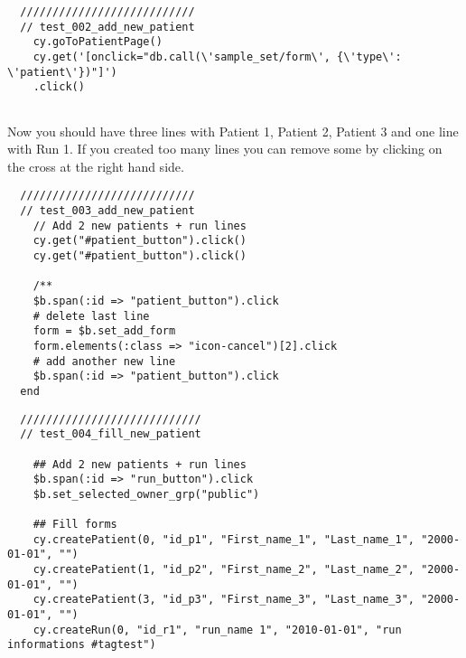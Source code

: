 \begin{verbatim}
  ///////////////////////////
  // test_002_add_new_patient
    cy.goToPatientPage()
    cy.get('[onclick="db.call(\'sample_set/form\', {\'type\': \'patient\'})"]')
    .click()


\end{verbatim}

  Now you should have three lines with Patient 1, Patient 2, Patient 3 and one
  line with Run 1.
  If you created too many lines you can remove some by clicking on the cross at
  the right hand side.

\begin{verbatim}
  ///////////////////////////
  // test_003_add_new_patient
    // Add 2 new patients + run lines
    cy.get("#patient_button").click()
    cy.get("#patient_button").click()

    /**
    $b.span(:id => "patient_button").click
    # delete last line
    form = $b.set_add_form
    form.elements(:class => "icon-cancel")[2].click
    # add another new line
    $b.span(:id => "patient_button").click
  end

\end{verbatim}

\begin{verbatim}
  ////////////////////////////
  // test_004_fill_new_patient

    ## Add 2 new patients + run lines
    $b.span(:id => "run_button").click
    $b.set_selected_owner_grp("public")

    ## Fill forms
    cy.createPatient(0, "id_p1", "First_name_1", "Last_name_1", "2000-01-01", "")
    cy.createPatient(1, "id_p2", "First_name_2", "Last_name_2", "2000-01-01", "")
    cy.createPatient(3, "id_p3", "First_name_3", "Last_name_3", "2000-01-01", "")
    cy.createRun(0, "id_r1", "run_name 1", "2010-01-01", "run informations #tagtest")
 

\end{verbatim}

